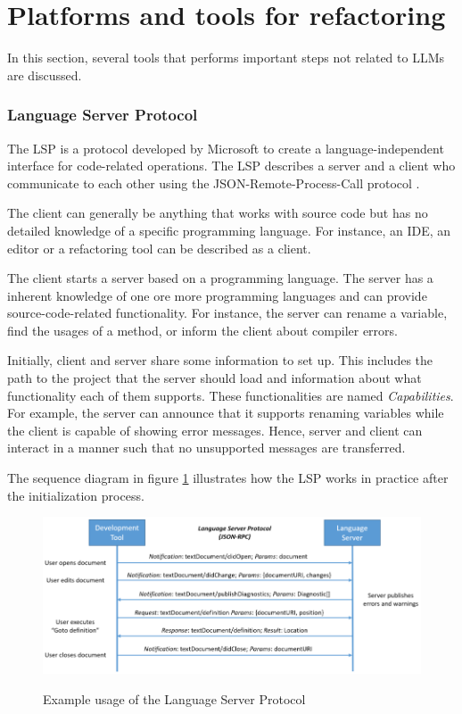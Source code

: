 \section{Platforms and tools for refactoring}

In this section, several tools that performs important steps not related to \acp{LLM} are discussed.
\subsubsection{Language Server Protocol} \label{sec:lsp}
The \ac{LSP}  \cite{lsp_website} is a protocol developed by Microsoft to create a language-independent interface for code-related operations. 
The \ac{LSP}  describes a server and a client who communicate to each other using the JSON-Remote-Process-Call protocol \cite{json_rpc}. 

The client can generally be anything that works with source code but has no detailed knowledge of a specific programming language. For instance, an \ac{IDE}, an editor or a refactoring tool can be described as a client.

The client starts a server based on a programming language. The server has a inherent knowledge of one ore more programming languages and can provide source-code-related functionality. For instance, the server can rename a variable, find the usages of a method, or inform the client about compiler errors. 

Initially, client and server share some information to set up. This includes the path to the project that the server should load and information about what functionality each of them supports. These functionalities are named \textit{Capabilities}. For example, the server can announce that it supports renaming variables while the client is capable of showing error messages. Hence, server and client can interact in a manner such that no unsupported messages are transferred.

The sequence diagram in figure \ref{fig:lsp_usage} illustrates how the \ac{LSP} works in practice after the initialization process. 
\begin{figure}
    \centering
    \includegraphics{figures/chapter2/language-server-sequence.png}
    \caption{Example usage of the Language Server Protocol}
    \label{fig:lsp_usage}
    \cite{lsp_website}
\end{figure}

